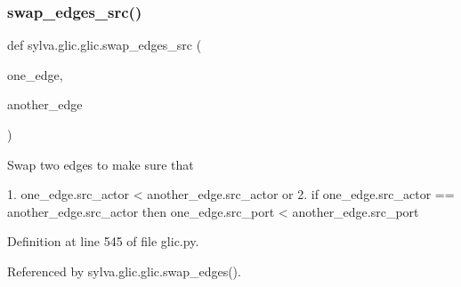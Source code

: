 \subsubsection{\texorpdfstring{swap\+\_\+edges\+\_\+src()}{swap\_edges\_src()}}
{\footnotesize\ttfamily def sylva.\+glic.\+glic.\+swap\+\_\+edges\+\_\+src (\begin{DoxyParamCaption}\item[{}]{one\+\_\+edge,  }\item[{}]{another\+\_\+edge }\end{DoxyParamCaption})}

\begin{DoxyVerb}  Swap two edges to make sure that

  1. one_edge.src_actor < another_edge.src_actor
  or
  2. if one_edge.src_actor == another_edge.src_actor
     then one_edge.src_port < another_edge.src_port
\end{DoxyVerb}
 

Definition at line 545 of file glic.\+py.



Referenced by sylva.\+glic.\+glic.\+swap\+\_\+edges().


